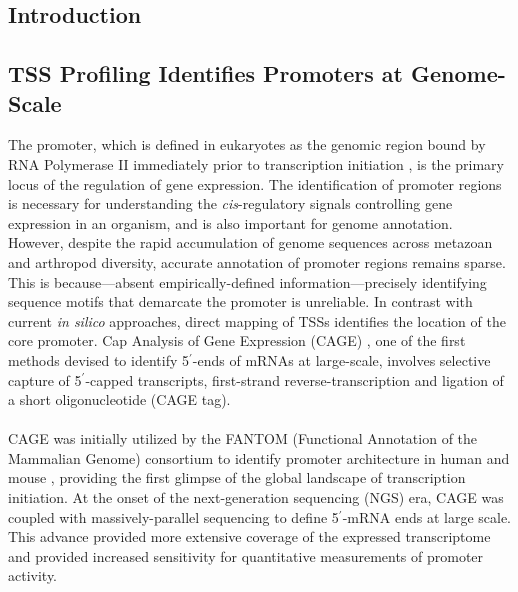 \documentclass[runningheads,a4paper]{llncs}
\begin{document}
\begin{linenumbers}
\section{Introduction}

\subsection{TSS Profiling Identifies Promoters at Genome-Scale}
The promoter, which is defined in eukaryotes as the genomic region bound by RNA Polymerase II immediately prior to transcription initiation \cite{Kadonaga:2011gz}, is the primary locus of the regulation of gene expression.
The identification of promoter regions is necessary for understanding the \textit{cis}-regulatory signals controlling gene expression in an organism, and is also important for genome annotation.
However, despite the rapid accumulation of genome sequences across metazoan and arthropod diversity, accurate annotation of promoter regions remains sparse. 
This is because---absent empirically-defined information---precisely identifying sequence motifs that demarcate the promoter is unreliable.
In contrast with current \textit{in silico} approaches, direct mapping of TSSs identifies the location of the core promoter.
Cap Analysis of Gene Expression (CAGE) \cite{Kodzius:2006gy}, one of the first methods devised to identify 5$^\prime$-ends of mRNAs at large-scale, involves selective capture of 5$^\prime$-capped transcripts, first-strand reverse-transcription and ligation of a short oligonucleotide (CAGE tag). \\
\\
CAGE was initially utilized by the FANTOM (Functional Annotation of the Mammalian Genome) consortium to identify promoter architecture in human and mouse \cite{Carninci:2005kp}, providing the first glimpse of the global landscape of transcription initiation.
At the onset of the next-generation sequencing (NGS) era, CAGE was coupled with massively-parallel sequencing to define 5$^\prime$-mRNA ends at large scale. 
This advance provided more extensive coverage of the expressed transcriptome and provided increased sensitivity for quantitative measurements of promoter activity.


\end{linenumbers}
\end{document}
